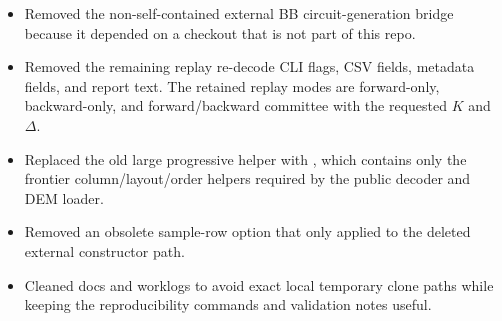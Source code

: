 \begin{itemize}
\item Removed the non-self-contained external BB circuit-generation bridge because it depended on a checkout that is not part of this repo.
\item Removed the remaining replay re-decode CLI flags, CSV fields, metadata fields, and report text. The retained replay modes are forward-only, backward-only, and forward/backward committee with the requested \(K\) and \(\Delta\).
\item Replaced the old large progressive helper with \texttt{}, which contains only the frontier column/layout/order helpers required by the public decoder and DEM loader.
\item Removed an obsolete sample-row option that only applied to the deleted external constructor path.
\item Cleaned docs and worklogs to avoid exact local temporary clone paths while keeping the reproducibility commands and validation notes useful.
\end{itemize}
